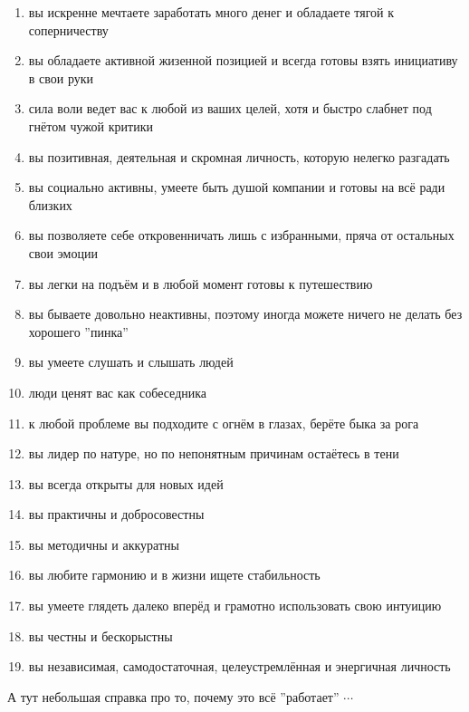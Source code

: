 \documentclass[a4paper, 12pt]{article}
\begin{document}
\begin{multicols*}{2}
\begin{enumerate}
        \item вы искренне мечтаете заработать много денег и обладаете тягой к соперничеству
        \item вы обладаете активной жизенной позицией и всегда готовы взять инициативу в свои руки
        \item сила воли ведет вас к любой из ваших целей, хотя и быстро  слабнет под гнётом чужой критики
        \item вы позитивная, деятельная и скромная личность, которую нелегко разгадать 
        \item вы социально активны, умеете быть душой компании и готовы на всё ради близких
        \item вы позволяете себе откровенничать лишь с избранными, пряча от остальных свои эмоции
        \item вы легки на подъём и в любой момент готовы к путешествию
        \item вы бываете довольно неактивны, поэтому иногда можете ничего не делать без хорошего ''пинка''
        \item вы умеете слушать и слышать людей
        \item люди ценят вас как собеседника
        \item к любой проблеме вы подходите с огнём в глазах, берёте быка за рога
        \item вы лидер по натуре, но по непонятным причинам остаётесь в тени
        \item вы всегда открыты для новых идей
        \item вы практичны и добросовестны
        \item вы методичны и аккуратны
        \item вы любите гармонию и в жизни ищете стабильность
        \item вы умеете глядеть далеко вперёд и грамотно использовать свою интуицию
        \item вы честны и бескорыстны
        \item вы независимая, самодостаточная, целеустремлённая и энергичная личность
    \end{enumerate}
\end{multicols*}
\newpage
А тут небольшая справка про то, почему это всё ''работает''
$\cdots$
\end{document}

